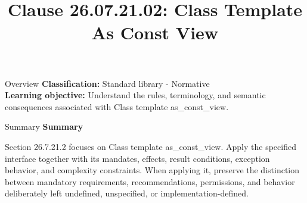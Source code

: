 \documentclass[10pt,letterpaper]{article}
\title{Clause 26.07.21.02: Class Template As Const View}
\author{}
\date{}
\begin{document}
\maketitle
\begin{CornellOverviewBox}{Overview}
\textbf{Classification:} Standard library - Normative\\[2pt]
\textbf{Learning objective:} Understand the rules, terminology, and semantic consequences associated with Class template as\_const\_view.
\end{CornellOverviewBox}\begin{CornellSummaryBox}{Summary}
{\sffamily\bfseries\color{Accent} Summary}\par\vspace{3pt}Section 26.7.21.2 focuses on Class template as\_const\_view. Apply the specified interface together with its mandates, effects, result conditions, exception behavior, and complexity constraints. When applying it, preserve the distinction between mandatory requirements, recommendations, permissions, and behavior deliberately left undefined, unspecified, or implementation-defined.
\end{CornellSummaryBox}
\end{document}
